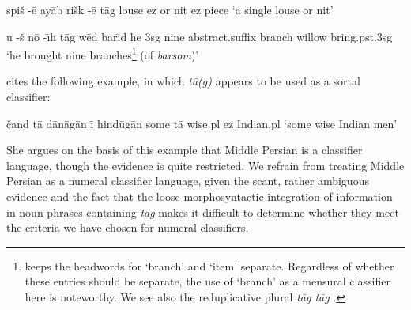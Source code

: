 \documentclass[11pt]{article}
\begin{document}
\begin{examples}
\item \gll spi\v{s} -\=e ay\={a}b ri\v{s}k -\=e t\=ag
louse {\sc ez} or nit {\sc ez} piece
\glt `a single louse or nit' \citep[390]{Moazami2014}
\glend
\end{examples}


\begin{examples}
\item \gll u -\v{s} n\=o -\={\i}h t\=ag w\=ed bar\={\i}d
he {\sc 3sg} nine {\sc abstract.suffix} branch willow bring.{\sc pst.3sg}
\glt `he brought nine branches\footnote{\citet{Mackenzie1971} keeps the headwords for `branch' and `item' separate. Regardless of whether these entries should be separate, the use of `branch' as a mensural classifier here is noteworthy. We see also the reduplicative plural {\it t\=ag t\=ag} \citep[122]{Moazami2014}.} (of {\it barsom})' \citep[468]{Moazami2014}
\glend
\end{examples}
\citet[171]{Mache2012} cites the following example, in which {\it t\=a(g)} appears to be used as a sortal classifier:
\begin{examples}
\item \gll \v{c}and t\=a d\=an\=ag\=an \={\i} hind\=ug\=an
some t\=a wise.{\sc pl} {\sc ez} Indian.{\sc pl}
\glt `some wise Indian men'
\glend
\end{examples}
She argues on the basis of this example that Middle Persian is a classifier language, though the evidence is quite restricted. %
We refrain from treating Middle Persian as a numeral classifier language, given the scant, rather ambiguous evidence and the fact that the loose morphosyntactic integration of information in noun phrases containing {\it t\=ag} makes it difficult to determine whether they meet the criteria we have chosen for numeral classifiers. 
\end{document}
